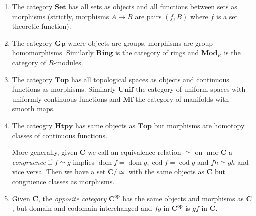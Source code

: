 \documentclass[a4paper]{article}
\renewcommand{\c}[1]{\mathbf{#1}}
\DeclareMathOperator{\mor}{mor}
\DeclareMathOperator{\dom}{dom}
\DeclareMathOperator{\cod}{cod}
\newcommand{\Set}{{\c{Set}}}
\newcommand{\Top}{{\c{Top}}}
\begin{document}
\begin{eg}\leavevmode
  \begin{enumerate}
  \item The category \(\Set\) has all sets as objects and all functions between sets as morphisms (strictly, morphisms \(A \to B\) are pairs \((f, B)\) where \(f\) is a set theoretic function).
  \item The category \(\c{Gp}\) where objects are groups, morphisms are group homomorphisms. Similarly \(\c{Ring}\) is the category of rings and \(\c{Mod}_R\) is the category of \(R\)-modules.
  \item The category \(\Top\) has all topological spaces as objects and continuous functions as morphisms. Similarly \(\c{Unif}\) the category of uniform spaces with uniformly continuous functions and \(\c{Mf}\) the category of manifolds with smooth maps.
  \item The cateogry \(\c{Htpy}\) has same objects as \(\Top\) but morphisms are homotopy classes of continuous functions.

    More generally, given \(\c C\) we call an equivalence relation \(\simeq\) on \(\mor \c C\) a \emph{congruence} if \(f \simeq g\) implies \(\dom f = \dom g, \cod f = \cod g\) and \(fh \simeq gh\) and vice versa. %
    Then we have a set \(\c C / \simeq\) with the same objects as \(\c C\) but congruence classes as morphisms.
  \item Given \(\c C\), the \emph{opposite category} \(\c C^{\text{op}}\) has the same objects and morphisms as \(\c C\), but domain and codomain interchanged and \(fg\) in \(\c C^{\text{op}}\) is \(gf\) in \(\c C\).


\end{enumerate}
\end{eg}
\end{document}
